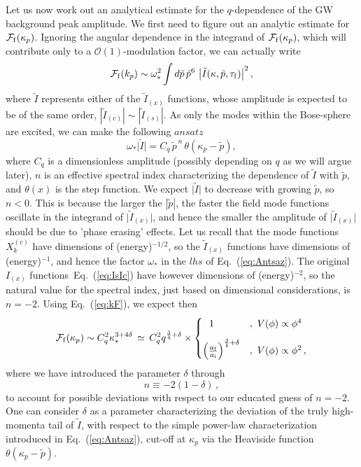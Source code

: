 \documentclass[a4paper,11pt]{article}
\begin{document}
Let us now work out an analytical estimate for the $q$-dependence of the GW background peak amplitude. We first need to figure out an analytic estimate for $\mathcal{F}_{\rm f}(\kappa_{p})$. Ignoring the angular dependence in the integrand of $\mathcal{F}_{\rm f}(\kappa_{p})$, which will contribute only to a $\mathcal{O}(1)$-modulation factor, we can actually write
\begin{equation}
\mathcal{F}_{\rm f}(k_{p}) \sim \omega_*^2\int d\tilde p\, {\tilde p}^{6} \,\left|\tilde I(\kappa,\tilde p,\tau_{\rm f})\right|^{2},
\end{equation}
where $\tilde{I}$ represents either of the $\tilde{I}_{(x)}$ functions, whose amplitude is expected to be of the same order, $|\tilde{I}_{(c)}| \sim |\tilde {I}_{(s)}|$. As only the modes within the Bose-sphere are excited, we can make the following $ansatz$
\begin{equation}\label{eq:Antsaz}
\omega_*\big|\tilde{I}\big| = C_q\,{\tilde p^{\,n}}\,\theta(\kappa_{p}-\tilde p),
\end{equation}
where $C_q$ is a dimensionless amplitude (possibly depending on $q$ as we will argue later), $n$ is an effective spectral index characterizing the dependence of $\tilde I$ with $\tilde p$, and $\theta(x)$ is the step function. We expect $\big|\tilde I\big|$ to decrease with growing $\tilde p$, so $n < 0$. This is because the larger the $|\tilde p|$, the faster the field mode functions oscillate in the integrand of $\big|\tilde I_{(x)}\big|$, and hence the smaller the amplitude of $\big|\tilde{I}_{(x)}\big|$ should be due to 'phase erasing' effects. Let us recall that the mode functions $X_k^{(c)}$ have dimensions of (energy)$^{-1/2}$, so the $\tilde I_{(x)}$ functions have dimensions of (energy)$^{-1}$, and hence the factor $\omega_*$ in the $lhs$ of Eq.~(\ref{eq:Antsaz}). The original $I_{(x)}$ functions~Eq.~(\ref{eq:IsIc}) have however dimensions of (energy)$^{-2}$, so the natural value for the spectral index, just based on dimensional considerations, is $n = -2$. Using Eq.~(\ref{eq:kF}), we expect then
\begin{equation}\label{eq:Antsaz_F*}
\mathcal{F}_{\rm f}(\kappa_{p}) \sim C_q^2\kappa_{*}^{3+4\delta} \,\simeq\, C_q^2q^{\frac{3}{4}+\delta}\times\begin{cases}
 ~~1 &, ~V(\phi)\propto\phi^{4}\vspace{0.3cm}\\
\left({a_{\rm f}\over a_{\rm i}}\right)^{\frac{3}{4}+\delta} &, ~V(\phi)\propto\phi^{2}\,,
\end{cases}
\end{equation}
where we have introduced the parameter $\delta$ through
\begin{equation}
n \equiv -2(1 - \delta)\,,
\end{equation}
to account for possible deviations with respect to our educated guess of $n = -2$. One can consider $\delta$ as a parameter characterizing the deviation of the truly high-momenta tail of $\tilde{I}$, with respect to the simple power-law characterization introduced in Eq.~(\ref{eq:Antsaz}), cut-off at $\kappa_p$ via the Heaviside function $\theta(\kappa_{p}-\tilde p)$.
\end{document}
